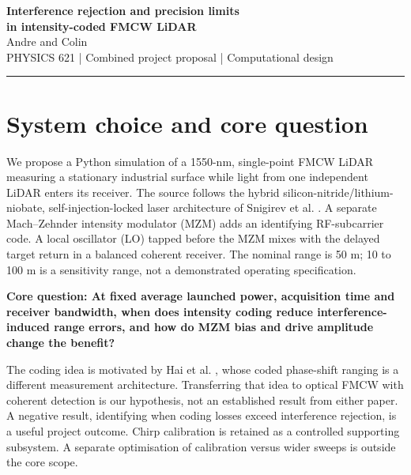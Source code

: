 \documentclass[10pt,letterpaper]{article}
\begin{document}
\begin{center}
{\LARGE\bfseries\color{ink} Interference rejection and precision limits\\[3pt] in intensity-coded FMCW LiDAR}\\[6pt]
{\large Andre and Colin}\\[3pt]
{\small PHYSICS 621 | Combined project proposal | Computational design}
\end{center}
{\color{accent}\rule{\linewidth}{0.7pt}}
\section{System choice and core question}
We propose a Python simulation of a 1550-nm, single-point FMCW LiDAR measuring a stationary industrial surface while light from one independent LiDAR enters its receiver. The source follows the hybrid silicon-nitride/lithium-niobate, self-injection-locked laser architecture of Snigirev et al. \cite{snigirev}. A separate Mach--Zehnder intensity modulator (MZM) adds an identifying RF-subcarrier code. A local oscillator (LO) tapped before the MZM mixes with the delayed target return in a balanced coherent receiver. The nominal range is 50 m; 10 to 100 m is a sensitivity range, not a demonstrated operating specification.

\textbf{Core question: At fixed average launched power, acquisition time and receiver bandwidth, when does intensity coding reduce interference-induced range errors, and how do MZM bias and drive amplitude change the benefit?}

The coding idea is motivated by Hai et al. \cite{hai}, whose coded phase-shift ranging is a different measurement architecture. Transferring that idea to optical FMCW with coherent detection is our hypothesis, not an established result from either paper. A negative result, identifying when coding losses exceed interference rejection, is a useful project outcome. Chirp calibration is retained as a controlled supporting subsystem. A separate optimisation of calibration versus wider sweeps is outside the core scope.
\end{document}
